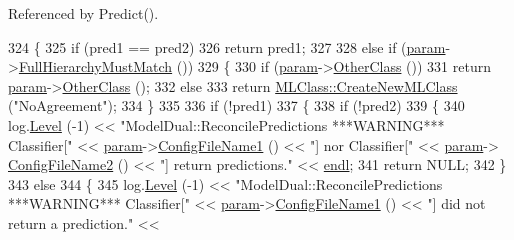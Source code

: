 Referenced by Predict().


\begin{DoxyCode}
324 \{
325   \textcolor{keywordflow}{if}  (pred1 == pred2)
326     \textcolor{keywordflow}{return} pred1;
327 
328   \textcolor{keywordflow}{else} \textcolor{keywordflow}{if}  (\hyperlink{class_k_k_m_l_l_1_1_model_dual_ac78b32cfbe102267574423e84aba9e42}{param}->\hyperlink{class_k_k_m_l_l_1_1_model_param_dual_ab358ce3c1c30ecb0ec22dd269d0d8098}{FullHierarchyMustMatch} ())
329   \{
330     \textcolor{keywordflow}{if}  (\hyperlink{class_k_k_m_l_l_1_1_model_dual_ac78b32cfbe102267574423e84aba9e42}{param}->\hyperlink{class_k_k_m_l_l_1_1_model_param_dual_a5069c91281030811fb8563009ed0c488}{OtherClass} ())
331       \textcolor{keywordflow}{return} \hyperlink{class_k_k_m_l_l_1_1_model_dual_ac78b32cfbe102267574423e84aba9e42}{param}->\hyperlink{class_k_k_m_l_l_1_1_model_param_dual_a5069c91281030811fb8563009ed0c488}{OtherClass} ();
332     \textcolor{keywordflow}{else}
333       \textcolor{keywordflow}{return} \hyperlink{class_k_k_m_l_l_1_1_m_l_class_a9fd24c617c42d89afc92414575e00e9a}{MLClass::CreateNewMLClass} (\textcolor{stringliteral}{"NoAgreement"});
334   \}
335 
336   \textcolor{keywordflow}{if}  (!pred1)
337   \{
338     \textcolor{keywordflow}{if}  (!pred2)
339     \{
340       log.\hyperlink{class_k_k_b_1_1_run_log_a32cf761d7f2e747465fd80533fdbb659}{Level} (-1) << \textcolor{stringliteral}{"ModelDual::ReconcilePredictions ***WARNING***  Classifier["} << 
      \hyperlink{class_k_k_m_l_l_1_1_model_dual_ac78b32cfbe102267574423e84aba9e42}{param}->\hyperlink{class_k_k_m_l_l_1_1_model_param_dual_af2900e50f7a1ea37e236b50f8f005837}{ConfigFileName1} () << \textcolor{stringliteral}{"] nor Classifier["} << \hyperlink{class_k_k_m_l_l_1_1_model_dual_ac78b32cfbe102267574423e84aba9e42}{param}->
      \hyperlink{class_k_k_m_l_l_1_1_model_param_dual_ab8f04150ca014f0d8244b0f01a10503a}{ConfigFileName2} () << \textcolor{stringliteral}{"]  return predictions."} << \hyperlink{namespace_k_k_b_ad1f50f65af6adc8fa9e6f62d007818a8}{endl};
341       \textcolor{keywordflow}{return}  NULL;
342     \}
343     \textcolor{keywordflow}{else}
344     \{
345       log.\hyperlink{class_k_k_b_1_1_run_log_a32cf761d7f2e747465fd80533fdbb659}{Level} (-1) << \textcolor{stringliteral}{"ModelDual::ReconcilePredictions  ***WARNING***  Classifier["} << 
      \hyperlink{class_k_k_m_l_l_1_1_model_dual_ac78b32cfbe102267574423e84aba9e42}{param}->\hyperlink{class_k_k_m_l_l_1_1_model_param_dual_af2900e50f7a1ea37e236b50f8f005837}{ConfigFileName1} () << \textcolor{stringliteral}{"] did not return a prediction."} << 

\end{DoxyCode}
